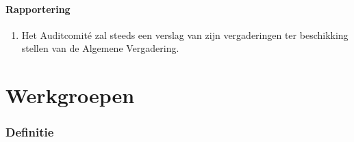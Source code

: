     \subsection{Rapportering}
    \begin{enumerate}
    \item Het Auditcomit\'e zal steeds een verslag van zijn vergaderingen ter beschikking stellen van de Algemene Vergadering.
    \end{enumerate}


\part{Werkgroepen}
\section{Definitie}
